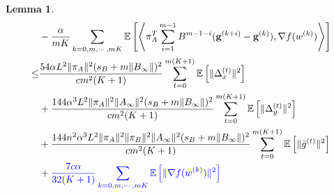 \documentclass{article}
\newtheorem{lemma}[thm]{Lemma}
\newcommand{\vg}{{\mathbf{g}}}
\newcommand{\EE}[1]{\mathbb{E}\left[#1\right]}
\newcommand{\norm}[1]{\| #1 \|}
\newcommand{\ip}[1]{\left\langle#1\right\rangle}
\begin{document}
\begin{lemma}
    \begin{align*}
    &-\frac{\alpha}{mK}\sum_{k=0,m,\cdots,mK}\EE{\ip{\pi_A^T\sum_{i=1}^{m-1}B^{m-1-i}(\vg^{(k+i)}-\vg^{(k)}),\nabla f(w^{(k)})}}\\ 
    \leq&\frac{54\alpha L^2\norm{\pi_A}^2(s_B+m\norm{B_{\infty}})^2}{cm^2(K+1)}\sum_{t=0}^{m(K+1)}\EE{\norm{\Delta_x^{(t)}}^2}\\&+\frac{144\alpha^3L^2\norm{\pi_A}^2\norm{A_{\infty}}^2(s_B+m\norm{B_{\infty}})^2}{cm^2(K+1)}\sum_{t=0}^{m(K+1)}\EE{\norm{\Delta_y^{(t)}}^2}
    \\&+\frac{144n^2\alpha^3L^2\norm{\pi_A}^2\norm{\pi_B}^2\norm{A_{\infty}}^2(s_B+m\norm{B_{\infty}})^2}{cm^2(K+1)}\sum_{t=0}^{m(K+1)}\EE{\norm{\bar{g}^{(t)}}^2}\\&+\textcolor{blue}{\frac{7c\alpha}{32(K+1)}\sum_{k=0,m,\cdots,mK}\EE{\norm{\nabla f(w^{(k)})}^2}}
  \end{align*}
\end{lemma}
\end{document}
